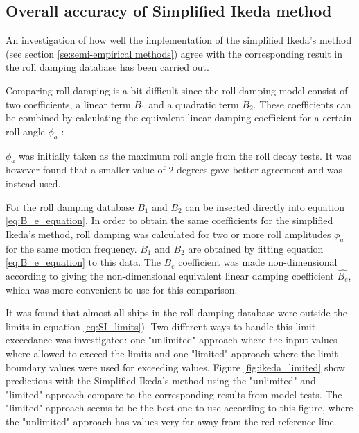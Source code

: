 \subsection{Overall accuracy of Simplified Ikeda method}
\label{se:overall_comparison}
An investigation of how well the implementation of the simplified Ikeda's method (see section \ref{se:semi-empirical methods}) agree with the corresponding result in the roll damping database has been carried out. 

Comparing roll damping is a bit difficult since the roll damping model consist of two coefficients, a linear term $B_1$ and a quadratic term $B_2$. These coefficients can be combined by calculating the equivalent linear damping coefficient for a certain roll angle $\phi_a$ \parencite{himeno_prediction_1981}:


$\phi_a$ was initially taken as the maximum roll angle from the roll decay tests. It was however found that a smaller value of 2 degrees gave better agreement and was instead used.

For the roll damping database $B_1$ and $B_2$ can be inserted directly into equation  \ref{eq:B_e_equation}. 
In order to obtain the same coefficients for the simplified Ikeda's method, roll damping was calculated for two or more roll amplitudes $\phi_a$ for the same motion frequency. $B_1$ and $B_2$ are obtained by fitting equation \ref{eq:B_e_equation} to this data. The $B_e$ coefficient was made non-dimensional according to \parencite{himeno_prediction_1981} giving the non-dimensional equivalent linear damping coefficient $\hat{B_e}$, which was more convenient to use for this comparison. 

It was found that almost all ships in the roll damping database were outside the limits in equation \ref{eq:SI_limits}). Two different ways to handle this limit exceedance was investigated: one "unlimited" approach where the input values where allowed to exceed the limits and one "limited" approach where the limit boundary values were used for exceeding values. Figure \ref{fig:ikeda_limited} show predictions with the Simplified Ikeda's method using the "unlimited" and "limited" approach compare to the corresponding results from model tests. The "limited" approach seems to be the best one to use according to this figure, where the "unlimited" approach has values very far away from the red reference line.   


